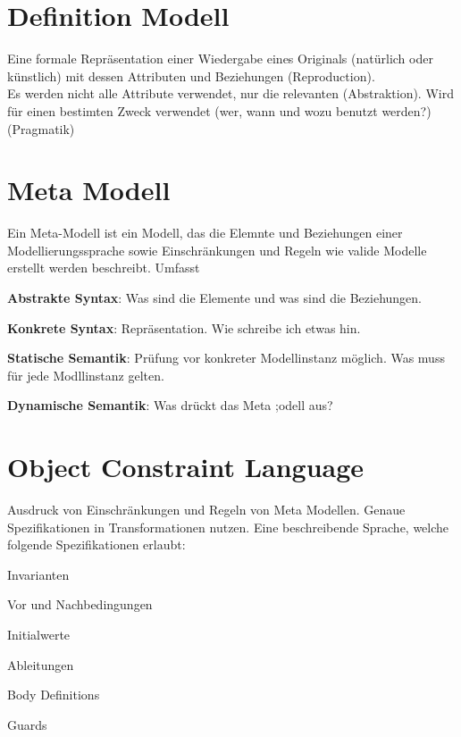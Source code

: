 \section{Definition Modell}
Eine formale Repräsentation einer
Wiedergabe eines Originals (natürlich oder künstlich) mit dessen Attributen und
Beziehungen (Reproduction). \\
Es werden nicht alle Attribute verwendet, nur die relevanten (Abstraktion).
Wird für einen bestimten Zweck verwendet (wer, wann und wozu benutzt werden?)
(Pragmatik)

\section{Meta Modell}
Ein Meta-Modell ist ein Modell, das die Elemnte  und Beziehungen einer
Modellierungssprache sowie Einschränkungen und Regeln wie valide Modelle erstellt
werden beschreibt. Umfasst
\begin{compactitem}
    \item \textbf{Abstrakte Syntax}: Was sind die Elemente und was sind die Beziehungen.
    \item \textbf{Konkrete Syntax}: Repräsentation. Wie schreibe ich etwas hin.
    \item \textbf{Statische Semantik}: Prüfung vor konkreter Modellinstanz möglich.
    Was muss für jede Modllinstanz gelten.
    \item \textbf{Dynamische Semantik}: Was drückt das Meta ;odell aus?
\end{compactitem}

\section{Object Constraint Language}
Ausdruck von Einschränkungen und Regeln von Meta Modellen.
Genaue Spezifikationen in Transformationen nutzen.
Eine beschreibende Sprache, welche folgende Spezifikationen erlaubt:
\begin{compactitem}
    \item Invarianten
    \item Vor und Nachbedingungen
    \item Initialwerte
    \item Ableitungen
    \item Body Definitions
    \item Guards
\end{compactitem}
